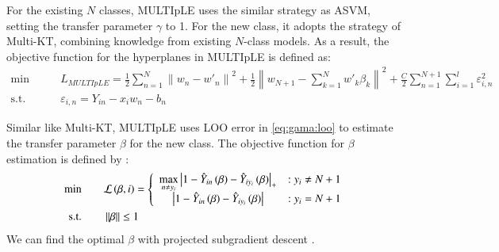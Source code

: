 For the existing $N$ classes, MULTIpLE uses the similar strategy as ASVM, setting the transfer parameter $\gamma$ to 1. For the new class, it adopts the strategy of Multi-KT, combining knowledge from existing $N$-class models. As a result, the objective function for the hyperplanes in MULTIpLE is defined as:
\begin{equation}
\begin{aligned}
\text{min}\qquad {} & L_{MULTIpLE}=\frac{1}{2}\sum\limits_{n = 1}^N {{{\left\| {{w_n} - {{w'}_n}} \right\|}^2}}  + \frac{1}{2}{\left\| {{w_{N + 1}} - \sum\limits_{k = 1}^N {w{'_k}{\beta _k}} } \right\|^2}+ \frac{C}{2}\sum\limits_{n = 1}^{N + 1} {\sum\limits_{i = 1}^l {\varepsilon _{i,n}^2} }  \\
\text{s.t.}\qquad {} &{\varepsilon _{i,n}} = {Y_{in}} -  {x_i}{w_n} - {b_n}
\end{aligned}\label{eq:gama:multiple}
\end{equation}

Similar like Multi-KT, MULTIpLE uses LOO error in \eqref{eq:gama:loo} to estimate the transfer parameter $\beta$ for the new class. The objective function for $\beta$ estimation is defined by \cite{crammer2002algorithmic}:
\begin{equation}\label{eq:gama:multib}
\begin{aligned}
\text{min} \qquad& {\cal L}\left( {\beta ,i} \right) = \left\{ {\begin{array}{*{20}{c}}
{\mathop {\max }\limits_{n \ne {y_i}} {{\left| {1 - {{\hat Y}_{in}}\left( \beta  \right) - {{\hat Y}_{i{y_i}}}\left( \beta  \right)} \right|}_ + }}&{{:y_i} \ne N + 1}\\
{\left| {1 - {{\hat Y}_{in}}\left( \beta  \right) - {{\hat Y}_{i{y_i}}}\left( \beta  \right)} \right|}&{{:y_i} = N + 1}
\end{array}} \right.  \\
\text{s.t.} \qquad& \left\| \beta  \right\| \le 1
\end{aligned}
\end{equation}
We can find the optimal $\beta$ with projected subgradient descent \cite{BoydCO}. 